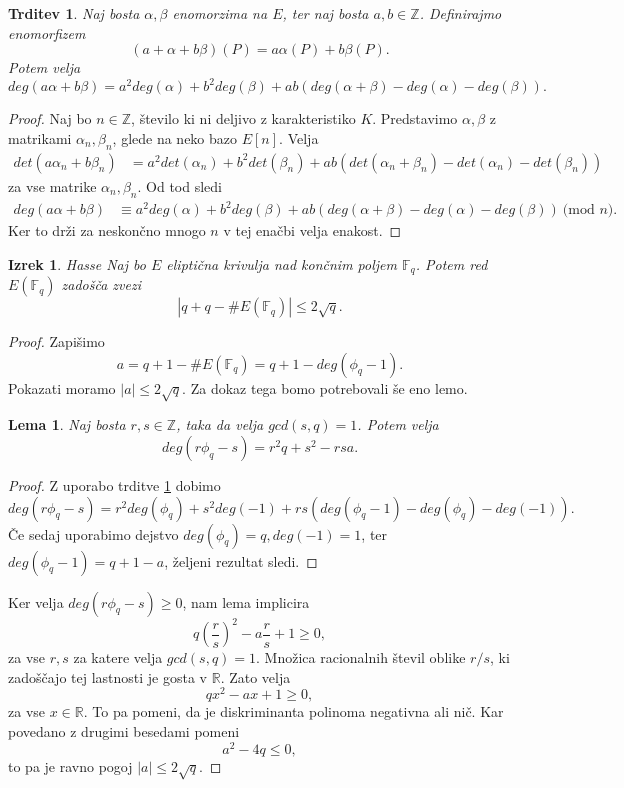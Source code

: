\documentclass[12pt,a4paper,twoside]{article}
\theoremstyle{definition} %
\theoremstyle{plain} %
\newtheorem{lema}[definicija]{Lema}
\newtheorem{izrek}[definicija]{Izrek}
\newtheorem{trditev}[definicija]{Trditev}
\numberwithin{equation}{section}  %
\newcommand{\R}{\mathbb R}
\newcommand{\Z}{\mathbb Z}
\newcommand{\F}{\mathbb F}
\newcommand{\E}[1]{E({#1})}
\newcommand{\MOD}[1]{\ \text{(mod }{#1}\text{)}}
\begin{document}
\begin{trditev}
\label{trd:3.16}
Naj bosta $\alpha,\beta$ enomorzima na $E$, ter naj bosta $a,b \in \Z$. Definirajmo enomorfizem
$$(a+\alpha+b\beta)(P) = a\alpha(P)+b\beta(P).$$
Potem velja
$$deg(a\alpha+b\beta) = a^2deg(\alpha)+b^2deg(\beta) + ab(deg(\alpha+\beta)-deg(\alpha)-deg(\beta)).$$
\end{trditev}

\begin{proof}
Naj bo $n \in \Z$, število ki ni deljivo z karakteristiko $K$. Predstavimo $\alpha,\beta$ z matrikami $\alpha_n,\beta_n$, glede na neko bazo $E[n]$.
Velja
\begin{align}
det(a\alpha_n+b\beta_n) &{}=  a^2det(\alpha_n)+b^2det(\beta_n) + ab(det(\alpha_n+\beta_n)-det(\alpha_n)-det(\beta_n)) \nonumber
\end{align}
za vse matrike $\alpha_n,\beta_n$.
Od tod sledi
\begin{align}
deg(a\alpha+b\beta) &{}\equiv a^2deg(\alpha)+b^2deg(\beta) + ab(deg(\alpha+\beta)-deg(\alpha)-deg(\beta)) \MOD{n}. \nonumber
\end{align}
Ker to drži za neskončno mnogo $n$ v tej enačbi velja enakost.


\end{proof}

\begin{izrek}{Hasse}
\label{izr:Hasse}
Naj bo $E$ eliptična krivulja nad končnim poljem $\F_q$.  Potem red $\E{\F_q}$ zadošča zvezi
$$|q+q-\#\E{\F_q}| \leq 2\sqrt{q}.$$
\end{izrek}

\begin{proof}
Zapišimo
$$a=q+1-\#\E{\F_q} = q+1 -deg(\phi_q-1).$$
Pokazati moramo $|a| \leq 2\sqrt{q}.$
Za dokaz tega bomo potrebovali še eno lemo.
\begin{lema}
Naj bosta $r,s \in \Z$, taka da velja $gcd(s,q)=1$. Potem velja
$$deg(r\phi_q-s) = r^2q+s^2-rsa.$$
\end{lema}

\begin{proof}
Z uporabo trditve \ref{trd:3.16} dobimo
$$deg(r\phi_q-s) = r^2deg(\phi_q)+s^2deg(-1)+rs(deg(\phi_q-1)-deg(\phi_q)-deg(-1)).$$
Če sedaj uporabimo dejstvo $deg(\phi_q) = q,deg(-1) = 1$, ter $deg(\phi_q-1) = q+1-a$, željeni rezultat sledi.
\end{proof}

Ker velja $deg(r\phi_q-s) \geq 0$, nam lema implicira
$$q(\frac{r}{s})^2-a\frac{r}{s}+1 \geq 0,$$
za vse $r,s$ za katere velja $gcd(s,q)=1$. Množica racionalnih števil oblike $r/s$, ki zadoščajo tej lastnosti je gosta v $\R$. Zato velja
$$qx^2-ax + 1 \geq 0,$$
za vse $x\in \R$. To pa pomeni, da je diskriminanta polinoma negativna ali nič. Kar povedano z drugimi besedami pomeni
$$a^2-4q \leq 0,$$
to pa je ravno pogoj $|a|\leq 2\sqrt{q}$.


\end{proof}
\end{document}
